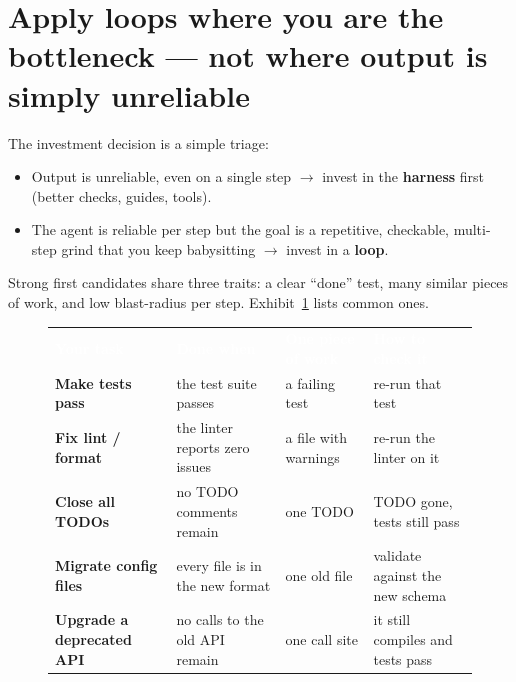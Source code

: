 \documentclass[11pt]{article}
\newcommand{\sotag}[1]{\textcolor{mckblue}{\textbf{#1}}}
\begin{document}
\section{Apply loops where you are the bottleneck --- not where output is simply unreliable}
The investment decision is a simple triage:
\begin{itemize}
\item Output is unreliable, even on a single step $\rightarrow$ invest in the
\sotag{harness} first (better checks, guides, tools).
\item The agent is reliable per step but the goal is a repetitive, checkable,
multi-step grind that you keep babysitting $\rightarrow$ invest in a \sotag{loop}.
\end{itemize}
Strong first candidates share three traits: a clear ``done'' test, many similar
pieces of work, and low blast-radius per step. Exhibit~\ref{ex:map} lists common
ones.

\begin{figure}[t]
\small
\renewcommand{\arraystretch}{1.35}
\begin{tabularx}{\textwidth}{@{}>{\bfseries\color{mckdeep}}p{} >{\raggedright\arraybackslash}X >{\raggedright\arraybackslash}p{} >{\raggedright\arraybackslash}X@{}}
\rowcolor{mckdeep}
\textcolor{white}{Your task} & \textcolor{white}{\textbf{Done when}} & \textcolor{white}{\textbf{One piece of work}} & \textcolor{white}{\textbf{How to check it}} \\
Make tests pass        & the test suite passes            & a failing test       & re-run that test \\
Fix lint / format      & the linter reports zero issues   & a file with warnings & re-run the linter on it \\
Close all TODOs        & no TODO comments remain          & one TODO             & TODO gone, tests still pass \\
Migrate config files   & every file is in the new format  & one old file         & validate against the new schema \\
Upgrade a deprecated API & no calls to the old API remain & one call site        & it still compiles and tests pass \\
\end{tabularx}
\label{ex:map}
\end{figure}
\end{document}

